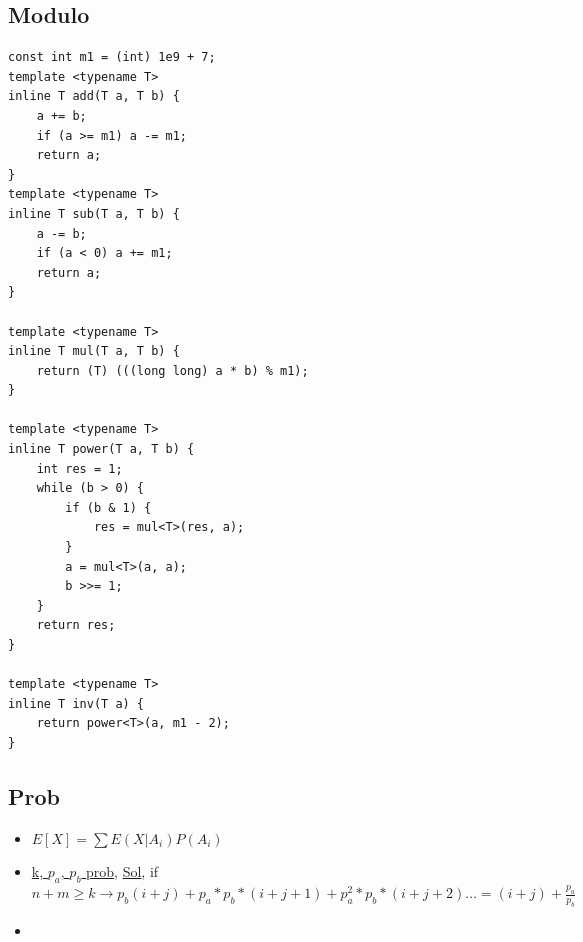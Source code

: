 \documentclass[8pt, a4paper, oneside, twocolumn]{extarticle}
\begin{document}
\subsection{Modulo}
\begin{verbatim}
const int m1 = (int) 1e9 + 7;
template <typename T>
inline T add(T a, T b) {
    a += b;
    if (a >= m1) a -= m1;
    return a;
}
template <typename T>
inline T sub(T a, T b) {
    a -= b;
    if (a < 0) a += m1;
    return a;
}

template <typename T>
inline T mul(T a, T b) {
    return (T) (((long long) a * b) % m1);
}

template <typename T>
inline T power(T a, T b) {
    int res = 1;
    while (b > 0) {
        if (b & 1) {
            res = mul<T>(res, a);
        }
        a = mul<T>(a, a);
        b >>= 1;
    }
    return res;
}

template <typename T>
inline T inv(T a) {
    return power<T>(a, m1 - 2);
}
\end{verbatim}
\subsection{Prob}
\begin{itemize}
    \item $E[X] = \sum E(X|A_i)P(A_i)$
    \item \href {https://codeforces.com/contest/908/problem/D}{k, $p_a$, $p_b$ prob}, \href {https://github.com/sourabh2311/Competitive-Programming/blob/master/CF/Good%20Bye%202017/D.cpp}{Sol}, if $n + m \geq k \rightarrow p_b(i + j) + p_a*p_b*(i + j + 1) + p_a^2*p_b*(i + j + 2)\dots = (i + j) + \frac{p_a}{p_b}$
    \item 
\end{itemize}
\end{document}
